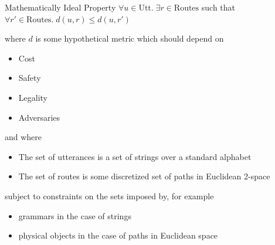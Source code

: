 \documentclass{beamer}
\begin{document}
\begin{frame}
\begin{block}{Mathematically Ideal Property}
  $\forall u \in \text{Utt}.\; \exists r \in \text{Routes}$
  such that $\forall r' \in \text{Routes}.\; d(u,r) \leq d(u,r')$
\end{block}
\pause
\begin{exampleblock}{}
where $d$ is some hypothetical metric which should depend on
\pause
\begin{itemize}[<+->]
\item Cost
\item Safety
\item Legality
\item Adversaries
\end{itemize}
\end{exampleblock}
\pause
\begin{exampleblock}{}
and where
\pause
\begin{itemize}[<+->]
\item The set of utterances is a set of strings over a standard alphabet
\item The set of routes is some discretized set of paths in Euclidean 2-space
\end{itemize}
\pause
subject to constraints on the sets imposed by, for example
\pause
\begin{itemize}[<+->]
\item grammars in the case of strings
\item physical objects in the case of paths in Euclidean space
\end{itemize}
\end{exampleblock}






\end{frame}
\end{document}
